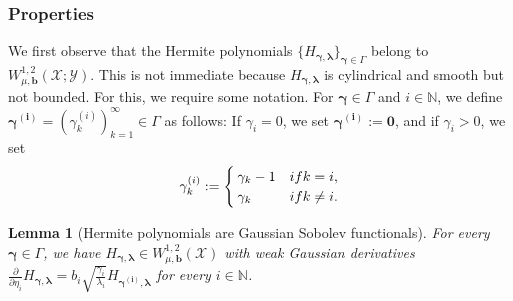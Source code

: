 \documentclass[namedate,webpdf]{ima-authoring-template-blank}
\newcounter{counter}
\numberwithin{counter}{section}
\numberwithin{equation}{section}
\theoremstyle{plain}
\newtheorem{lemma}[counter]{Lemma}
\theoremstyle{definition}
\newcommand*{\cX}{\mathcal{X}}
\newcommand*{\cY}{\mathcal{Y}}
\newcommand*{\bbN}{\mathbb{N}}
\theoremstyle{thmstyletwo}
\begin{document}
\subsubsection{Properties}

We first observe that the Hermite polynomials \( \{ H_{\bm{\gamma}, \bm{\lambda}} \}_{\bm{\gamma} \in \Gamma} \) belong to \( W_{\mu, \bm{b}}^{1, 2}(\cX; \cY) \). This is not immediate because \( H_{\bm{\gamma}, \bm{\lambda}} \) is cylindrical and smooth but not bounded. For this, we require some notation. For \( \bm{\gamma} \in \Gamma \) and \( i \in \bbN \), we define \( \bm{\gamma}^{\bm{(i)}} = (\gamma_k^{(i)})_{k = 1}^{\infty} \in \Gamma \) as follows: If \( \gamma_i = 0 \), we set  \( \bm{\gamma}^{\bm{(i)}} := \bm{0} \), and if \( \gamma_i > 0 \), we set
\[
\gamma_k^{(i)} := 
\begin{cases}
    \gamma_k - 1 & \textup{if } k = i, \\
    \gamma_k & \textup{if } k \neq i.
\end{cases}
\]

\begin{lemma}[Hermite polynomials are Gaussian Sobolev functionals]
\label{lem: Hermite polynomials in W12_mu}
    For every \( \bm{\gamma} \in \Gamma \), we have \( H_{\bm{\gamma}, \bm{\lambda}} \in W^{1,2}_{\mu, \bm{b}}(\cX) \) with weak Gaussian derivatives \( \frac{\partial}{\partial \eta_i} H_{\bm{\gamma}, \bm{\lambda}} = b_i \sqrt{\frac{\gamma_i}{\lambda_i}} H_{\bm{\gamma^{(i)}}, \bm{\lambda}} \) for every \( i \in \bbN \).
\end{lemma}
\end{document}
